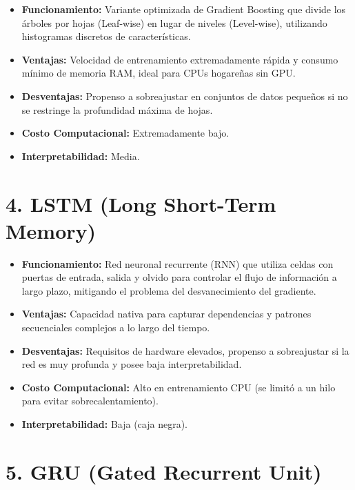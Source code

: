 \documentclass[
  spanish,
  12pt,
]{report}
\providecommand{\tightlist}{%
  \setlength{\itemsep}{0pt}\setlength{\parskip}{0pt}}
\begin{document}
\begin{itemize}
\tightlist
\item
  \textbf{Funcionamiento:} Variante optimizada de Gradient Boosting que
  divide los árboles por hojas (Leaf-wise) en lugar de niveles
  (Level-wise), utilizando histogramas discretos de características.
\item
  \textbf{Ventajas:} Velocidad de entrenamiento extremadamente rápida y
  consumo mínimo de memoria RAM, ideal para CPUs hogareñas sin GPU.
\item
  \textbf{Desventajas:} Propenso a sobreajustar en conjuntos de datos
  pequeños si no se restringe la profundidad máxima de hojas.
\item
  \textbf{Costo Computacional:} Extremadamente bajo.
\item
  \textbf{Interpretabilidad:} Media.
\end{itemize}

\section{4. LSTM (Long Short-Term
Memory)}\label{lstm-long-short-term-memory}

\begin{itemize}
\tightlist
\item
  \textbf{Funcionamiento:} Red neuronal recurrente (RNN) que utiliza
  celdas con puertas de entrada, salida y olvido para controlar el flujo
  de información a largo plazo, mitigando el problema del
  desvanecimiento del gradiente.
\item
  \textbf{Ventajas:} Capacidad nativa para capturar dependencias y
  patrones secuenciales complejos a lo largo del tiempo.
\item
  \textbf{Desventajas:} Requisitos de hardware elevados, propenso a
  sobreajustar si la red es muy profunda y posee baja interpretabilidad.
\item
  \textbf{Costo Computacional:} Alto en entrenamiento CPU (se limitó a
  un hilo para evitar sobrecalentamiento).
\item
  \textbf{Interpretabilidad:} Baja (caja negra).
\end{itemize}

\section{5. GRU (Gated Recurrent Unit)}\label{gru-gated-recurrent-unit}
\end{document}
